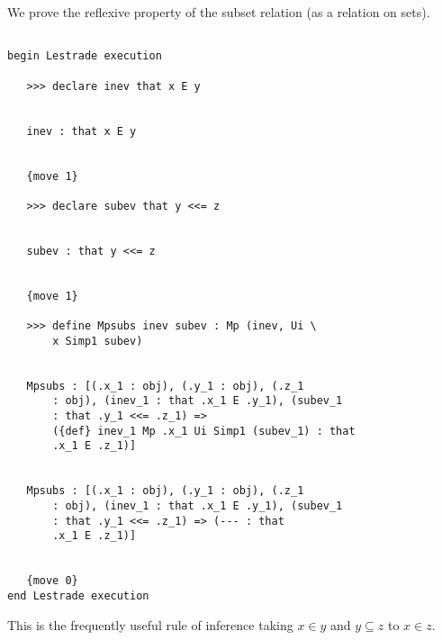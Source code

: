 \documentclass[12pt]{article}
\begin{document}
We prove the reflexive property of the subset relation (as a relation on sets).

\begin{verbatim}

begin Lestrade execution

   >>> declare inev that x E y


   inev : that x E y


   {move 1}

   >>> declare subev that y <<= z


   subev : that y <<= z


   {move 1}

   >>> define Mpsubs inev subev : Mp (inev, Ui \
       x Simp1 subev)


   Mpsubs : [(.x_1 : obj), (.y_1 : obj), (.z_1 
       : obj), (inev_1 : that .x_1 E .y_1), (subev_1 
       : that .y_1 <<= .z_1) => 
       ({def} inev_1 Mp .x_1 Ui Simp1 (subev_1) : that 
       .x_1 E .z_1)]


   Mpsubs : [(.x_1 : obj), (.y_1 : obj), (.z_1 
       : obj), (inev_1 : that .x_1 E .y_1), (subev_1 
       : that .y_1 <<= .z_1) => (--- : that 
       .x_1 E .z_1)]


   {move 0}
end Lestrade execution
\end{verbatim}

This is the frequently useful rule of inference taking $x \in y$ and $y \subseteq z$ to $x \in z$.
\end{document}
